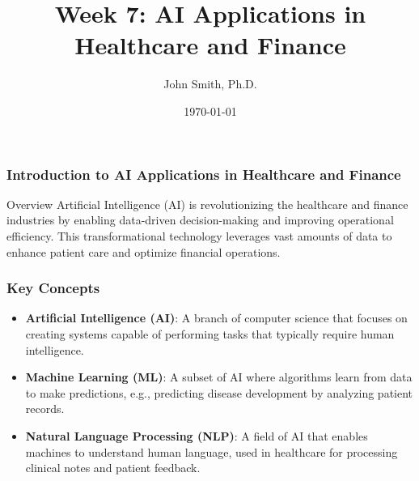 \documentclass[aspectratio=169]{beamer}
\title[AI Applications in Healthcare and Finance]{Week 7: AI Applications in Healthcare and Finance}
\author[J. Smith]{John Smith, Ph.D.}
\institute[University Name]{
  Department of Computer Science\\
  University Name\\
  \vspace{0.3cm}
  Email: email@university.edu\\
  Website: www.university.edu
}
\date{\today}
\begin{document}
\frame{\titlepage}

\begin{frame}[fragile]
    \frametitle{Introduction to AI Applications in Healthcare and Finance}
    \begin{block}{Overview}
        Artificial Intelligence (AI) is revolutionizing the healthcare and finance industries by enabling data-driven decision-making and improving operational efficiency. This transformational technology leverages vast amounts of data to enhance patient care and optimize financial operations.
    \end{block}
\end{frame}

\begin{frame}[fragile]
    \frametitle{Key Concepts}
    \begin{itemize}
        \item \textbf{Artificial Intelligence (AI)}: A branch of computer science that focuses on creating systems capable of performing tasks that typically require human intelligence.
        \item \textbf{Machine Learning (ML)}: A subset of AI where algorithms learn from data to make predictions, e.g., predicting disease development by analyzing patient records.
        \item \textbf{Natural Language Processing (NLP)}: A field of AI that enables machines to understand human language, used in healthcare for processing clinical notes and patient feedback.
    \end{itemize}
\end{frame}
\end{document}
